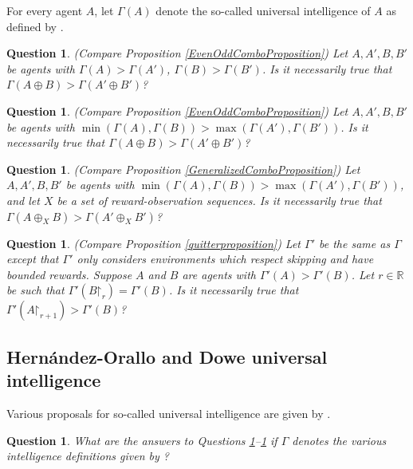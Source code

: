 \documentclass[twoside,11pt]{article}
\newtheorem{question}[theorem]{Question}
\begin{document}
For every agent $A$, let $\varGamma(A)$ denote the so-called universal intelligence of $A$
as defined by \citet{hutter2007}.

\begin{question}
\label{FirstOpenQuestion}
    (Compare Proposition \ref{EvenOddComboProposition})
    Let $A,A',B,B'$ be agents with $\varGamma(A)>\varGamma(A')$,
    $\varGamma(B)>\varGamma(B')$.
    Is it necessarily true that $\varGamma(A\oplus B)>\varGamma(A'\oplus B')$?
\end{question}

\begin{question}
    (Compare Proposition \ref{EvenOddComboProposition})
    Let $A,A',B,B'$ be agents
    with $\min(\varGamma(A),\varGamma(B))>\max(\varGamma(A'),\varGamma(B'))$.
    Is it necessarily true that $\varGamma(A\oplus B)>\varGamma(A'\oplus B')$?
\end{question}

\begin{question}
    (Compare Proposition \ref{GeneralizedComboProposition})
    Let $A,A',B,B'$ be agents
    with $\min(\varGamma(A),\varGamma(B))>\max(\varGamma(A'),\varGamma(B'))$,
    and let $X$ be a set of reward-observation sequences.
    Is it necessarily true that $\varGamma(A\oplus_X B)>\varGamma(A'\oplus_X B')$?
\end{question}

\begin{question}
\label{LastOpenQuestion}
    (Compare Proposition \ref{quitterproposition})
    Let $\varGamma'$ be the same as $\varGamma$ except that $\varGamma'$ only considers
    environments which respect skipping and have bounded rewards.
    Suppose $A$ and $B$ are agents with $\varGamma'(A)>\varGamma'(B)$.
    Let $r\in\mathbb R$
    be such that $\varGamma'(B\mathord{\restriction}_{r})=\varGamma'(B)$.
    Is it necessarily true that
    $\varGamma'(A\mathord{\restriction}_{r+1})>\varGamma'(B)$?
\end{question}


\subsection{Hern\'andez-Orallo and Dowe universal intelligence}

Various proposals for so-called universal intelligence are given by \citet{hernandez}.

\begin{question}
    What are the answers to Questions \ref{FirstOpenQuestion}--\ref{LastOpenQuestion}
    if $\varGamma$ denotes the various intelligence definitions
    given by \citet{hernandez}?
\end{question}
\end{document}
